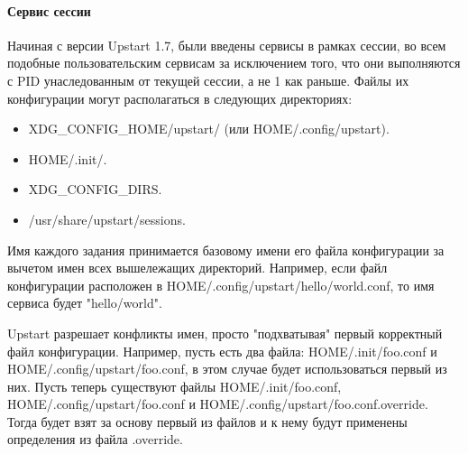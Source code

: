 \paragraph{Сервис сессии}
Начиная с версии Upstart 1.7, были введены сервисы в рамках сессии, во всем подобные пользовательским сервисам за исключением того, что они выполняются с PID унаследованным от текущей сессии, а не 1 как
раньше. 
Файлы их конфигурации могут располагаться в следующих директориях: \begin{itemize}
\item \textdollar XDG\_CONFIG\_HOME/upstart/ (или \textdollar HOME/.config/upstart).
\item \textdollar HOME/.init/.
\item \textdollar XDG\_CONFIG\_DIRS.
\item /usr/share/upstart/sessions.
\end{itemize}
Имя каждого задания принимается базовому имени его файла конфигурации за вычетом имен всех вышележащих директорий. Например, если файл конфигурации расположен в \textdollar HOME/.config/upstart/hello/world.conf, то имя сервиса будет "hello/world".

Upstart разрешает конфликты имен, просто "подхватывая" первый корректный файл конфигурации. Например, пусть есть два файла: \textdollar HOME/.init/foo.conf и \textdollar HOME/.config/upstart/foo.conf, 
в этом случае будет использоваться первый из них. Пусть теперь существуют файлы \textdollar HOME/.init/foo.conf, \textdollar HOME/.config/upstart/foo.conf и \textdollar HOME/.config/upstart/foo.conf.override. Тогда будет взят за основу первый из файлов и к нему будут применены определения из файла .override.
